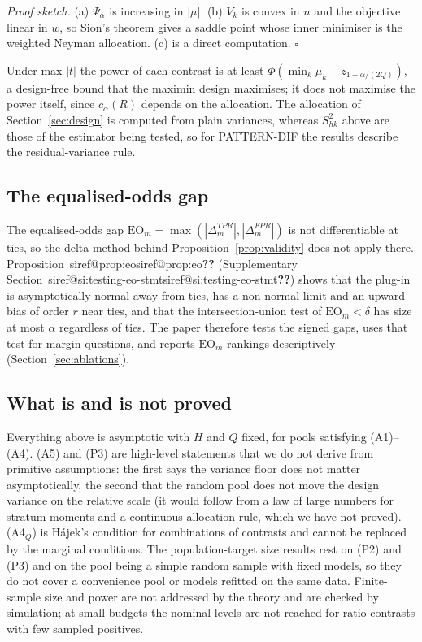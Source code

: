 \documentclass[pdflatex,sn-mathphys-num,iicol]{sn-jnl}
\makeatletter
\theoremstyle{thmstyleone}
\theoremstyle{thmstyletwo}
\theoremstyle{thmstylethree}
\newcommand{\SIref}[1]{\ifcsname siref@#1\endcsname\csname siref@#1\endcsname\else\textbf{??}\fi}
\makeatother
\begin{document}
\emph{Proof sketch.} (a) $\Psi_\alpha$ is increasing in $|\mu|$. (b) $V_k$ is convex in $n$ and the objective linear in $w$, so Sion's theorem \citep{sion1958} gives a saddle point whose inner minimiser is the weighted Neyman allocation. (c) is a direct computation. $\square$

Under max-$|t|$ the power of each contrast is at least $\Phi(\min_k\mu_k-z_{1-\alpha/(2Q)})$, a design-free bound that the maximin design maximises; it does not maximise the power itself, since $c_\alpha(R)$ depends on the allocation. The allocation of Section~\ref{sec:design} is computed from plain variances, whereas $S^2_{hk}$ above are those of the estimator being tested, so for PATTERN-DIF the results describe the residual-variance rule.

\subsection{The equalised-odds gap}\label{sec:test-eo}

The equalised-odds gap $\mathrm{EO}_m=\max(|\Delta^{TPR}_m|,|\Delta^{FPR}_m|)$ is not differentiable at ties, so the delta method behind Proposition~\ref{prop:validity} does not apply there. Proposition~\SIref{prop:eo} (Supplementary Section~\SIref{si:testing-eo-stmt}) shows that the plug-in is asymptotically normal away from ties, has a non-normal limit and an upward bias of order $r$ near ties, and that the intersection-union test of $\mathrm{EO}_m<\delta$ has size at most $\alpha$ regardless of ties. The paper therefore tests the signed gaps, uses that test for margin questions, and reports $\mathrm{EO}_m$ rankings descriptively (Section~\ref{sec:ablations}).

\subsection{What is and is not proved}\label{sec:test-limits}

Everything above is asymptotic with $H$ and $Q$ fixed, for pools satisfying (A1)--(A4). (A5) and (P3) are high-level statements that we do not derive from primitive assumptions: the first says the variance floor does not matter asymptotically, the second that the random pool does not move the design variance on the relative scale (it would follow from a law of large numbers for stratum moments and a continuous allocation rule, which we have not proved). (A4$_Q$) is H\'ajek's condition for combinations of contrasts and cannot be replaced by the marginal conditions. The population-target size results rest on (P2) and (P3) and on the pool being a simple random sample with fixed models, so they do not cover a convenience pool or models refitted on the same data. Finite-sample size and power are not addressed by the theory and are checked by simulation; at small budgets the nominal levels are not reached for ratio contrasts with few sampled positives.
\end{document}

